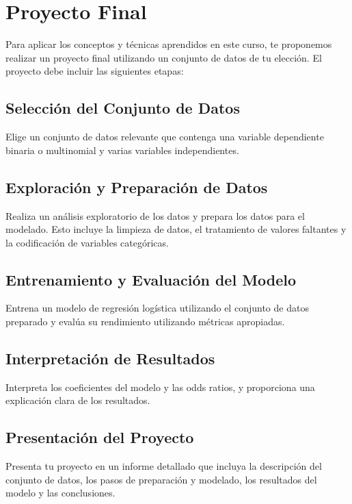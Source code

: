 \section{Proyecto Final}

Para aplicar los conceptos y t\'ecnicas aprendidos en este curso, te proponemos realizar un proyecto final utilizando un conjunto de datos de tu elecci\'on. El proyecto debe incluir las siguientes etapas:

\subsection{Selecci\'on del Conjunto de Datos}

Elige un conjunto de datos relevante que contenga una variable dependiente binaria o multinomial y varias variables independientes.

\subsection{Exploraci\'on y Preparaci\'on de Datos}

Realiza un an\'alisis exploratorio de los datos y prepara los datos para el modelado. Esto incluye la limpieza de datos, el tratamiento de valores faltantes y la codificaci\'on de variables categ\'oricas.

\subsection{Entrenamiento y Evaluaci\'on del Modelo}

Entrena un modelo de regresi\'on log\'istica utilizando el conjunto de datos preparado y eval\'ua su rendimiento utilizando m\'etricas apropiadas.

\subsection{Interpretaci\'on de Resultados}

Interpreta los coeficientes del modelo y las odds ratios, y proporciona una explicaci\'on clara de los resultados.

\subsection{Presentaci\'on del Proyecto}

Presenta tu proyecto en un informe detallado que incluya la descripci\'on del conjunto de datos, los pasos de preparaci\'on y modelado, los resultados del modelo y las conclusiones.

